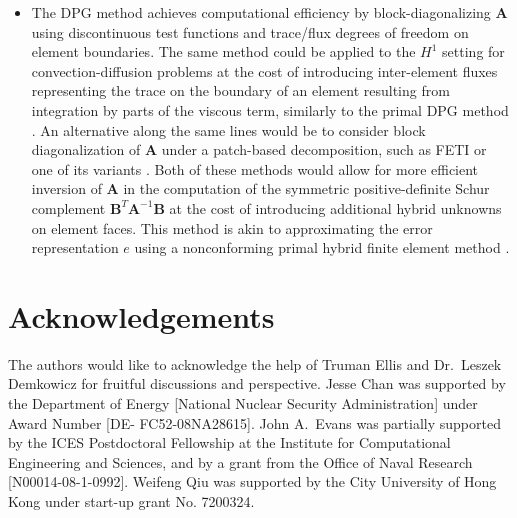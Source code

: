 \documentclass[final,leqno]{siamltex}
\newcommand{\bs}[1]{\boldsymbol{#1}}
\begin{document}
\begin{itemize}
\item The DPG method achieves computational efficiency by block-diagonalizing $\bs{A}$ using discontinuous test functions and trace/flux degrees of freedom on element boundaries.  The same method could be applied to the $H^1$ setting for convection-diffusion problems at the cost of introducing inter-element fluxes representing the trace on the boundary of an element resulting from integration by parts of the viscous term, similarly to the primal DPG method \cite{primalDPG}.  An alternative along the same lines would be to consider block diagonalization of $\bs{A}$ under a patch-based decomposition, such as FETI or one of its variants \cite{FETI1,FETI2}.  Both of these methods would allow for more efficient inversion of $\bs{A}$ in the computation of the symmetric positive-definite Schur complement $\bs{B}^T \bs{A}^{-1} \bs{B}$ at the cost of introducing additional hybrid unknowns on element faces.  This method is akin to approximating the error representation $e$ using a nonconforming primal hybrid finite element method \cite{raviart1977primal}.  
\end{itemize}

\section{Acknowledgements}

The authors would like to acknowledge the help of Truman Ellis and Dr.\ Leszek Demkowicz for fruitful discussions and perspective.  Jesse Chan was supported by the Department of Energy [National Nuclear Security Administration] under Award Number [DE- FC52-08NA28615].  John A.\ Evans was partially supported by the ICES Postdoctoral Fellowship at the Institute for Computational Engineering and Sciences, and by a grant from the Office of Naval Research [N00014-08-1-0992].   Weifeng Qiu was supported by the City University of Hong Kong under start-up grant No. 7200324.



\end{document}
